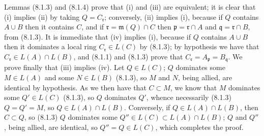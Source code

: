 \documentclass[../main.tex]{subfiles}
\begin{document}
Lemmas (8.1.3) and (8.1.4) prove that (i) and (iii) are equivalent; it is clear that (i) implies (ii) by taking $Q=C_\mathfrak{r}$; conversely, (ii) implies (i), because if $Q$ contains $A\cup B$ then it contains $C$, and if $\mathfrak{r}=\mathfrak{m}(Q)\cap C$ then $\mathfrak{p}=\mathfrak{r}\cap A$ and $\mathfrak{q}=\mathfrak{r}\cap B$, from (8.1.3).
It is immediate that (iv) implies (i), because if $Q$ contains $A\cup B$ then it dominates a local ring $C_\mathfrak{r}\in L(C)$ by (8.1.3); by hypothesis we have that $C_\mathfrak{r}\in L(A)\cap L(B)$, and (8.1.1) and (8.1.3) prove that $C_\mathfrak{r}=A_\mathfrak{p}=B_\mathfrak{q}$.
We prove finally that (iii) implies (iv).
Let $Q\in L(C)$; $Q$ dominates some $M\in L(A)$ and some $N\in L(B)$ (8.1.3), so $M$ and $N$, being allied, are identical by hypothesis.
As we then have that $C\subset M$, we know that $M$ dominates some $Q'\in L(C)$ (8.1.3), so $Q$ dominates $Q'$, whence necessarily (8.1.3) $Q=Q'=M$, so $Q\in L(A)\cap L(B)$.
Conversely, if $Q\in L(A)\cap L(B)$, then $C\subset Q$, so (8.1.3) $Q$ dominates some $Q''\in L(C)\subset L(A)\cap L(B)$; $Q$ and $Q''$, being allied, are identical, so $Q''=Q\in L(C)$, which completes the proof.
\end{document}
